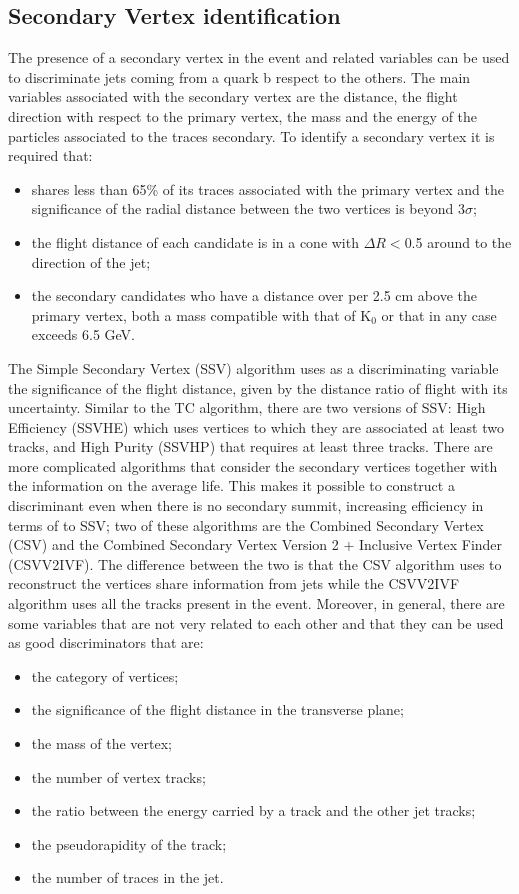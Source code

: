 \subsection*{Secondary Vertex identification}
The presence of a
secondary vertex in the event and related variables  can be used
to discriminate jets coming from a quark b respect to the others. The main variables associated with the secondary vertex are the distance, the flight direction
with respect to the primary vertex, the mass and the energy of the particles associated to the traces
secondary. To identify a secondary vertex it is required that:
\begin{itemize}
\item shares less than 65\% of its traces associated with the primary vertex and
the significance of the radial distance between the two vertices is beyond 3$\sigma$;
\item the flight distance of each candidate is in a cone with $\Delta R <$0.5 around
to the direction of the jet;
\item the secondary candidates who have a distance over
per 2.5 cm above the primary vertex, both a mass compatible with
that of K$_0$ or that in any case exceeds 6.5 GeV.
\end{itemize}
The Simple Secondary Vertex (SSV) algorithm uses as a discriminating variable 
the significance of the flight distance, given by the distance ratio of
flight with its uncertainty. Similar to the TC algorithm, there are two versions
of SSV: High Efficiency (SSVHE) which uses vertices to which they are associated at least
two tracks, and High Purity (SSVHP) that requires at least three tracks.
There are more complicated algorithms that consider the secondary vertices together with the
information on the average life. This makes it possible to construct a discriminant
even when there is no secondary summit, increasing efficiency in terms of
to SSV; two of these algorithms are the Combined Secondary Vertex (CSV) and the
Combined Secondary Vertex Version 2 + Inclusive Vertex Finder (CSVV2IVF).
The difference between the two is that the CSV algorithm uses to reconstruct the vertices share information from jets while the CSVV2IVF algorithm uses
all the tracks present in the event.
Moreover, in general, there are some variables that are not very related to each other and that
they can be used as good discriminators that are:
\begin{itemize}
\item the category of vertices;
\item the significance of the flight distance in the transverse plane;
\item the mass of the vertex;
\item the number of vertex tracks;
\item the ratio between the energy carried by a track and the other jet tracks;
\item the pseudorapidity of the track;
\item the number of traces in the jet.
\end{itemize}

